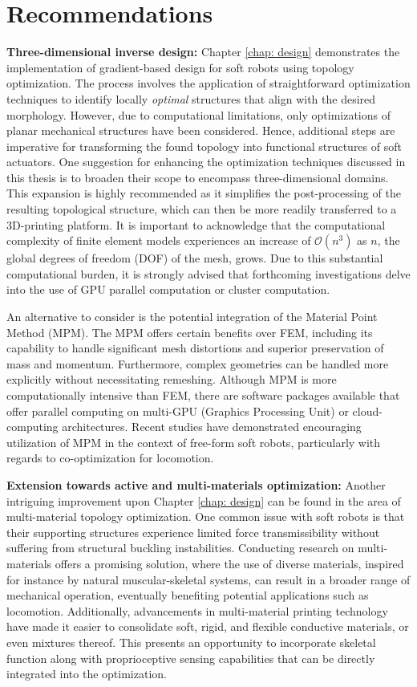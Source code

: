 \section[Recommendations]{Recommendations}
\textbf{Three-dimensional inverse design:}  Chapter \ref{chap: design} demonstrates the implementation of gradient-based design for soft robots using topology optimization. The process involves the application of straightforward optimization techniques to identify locally \textit{optimal} structures that align with the desired morphology. However, due to computational limitations, only optimizations of planar mechanical structures have been considered. Hence, additional steps are imperative for transforming the found topology into functional structures of soft actuators. One suggestion for enhancing the optimization techniques discussed in this thesis is to broaden their scope to encompass three-dimensional domains. This expansion is highly recommended as it simplifies the post-processing of the resulting topological structure, which can then be more readily transferred to a 3D-printing platform. It is important to acknowledge that the computational complexity of finite element models experiences an increase of $\mathcal{O}(n^3)$ as $n$, the global degrees of freedom (DOF) of the mesh, grows. Due to this substantial computational burden, it is strongly advised that forthcoming investigations delve into the use of GPU parallel computation or cluster computation.

An alternative to consider is the potential integration of the Material Point Method (MPM). The MPM offers certain benefits over FEM, including its capability to handle significant mesh distortions and superior preservation of mass and momentum. Furthermore, complex geometries can be handled more explicitly without necessitating remeshing. Although MPM is more computationally intensive than FEM, there are software packages available that offer parallel computing on multi-GPU (Graphics Processing Unit) or cloud-computing architectures. Recent studies have demonstrated encouraging utilization of MPM in the context of free-form soft robots, particularly with regards to co-optimization for locomotion. 

\textbf{Extension towards active and multi-materials optimization:} Another intriguing improvement upon Chapter \ref{chap: design} can be found in the area of multi-material topology optimization. One common issue with soft robots is that their supporting structures experience limited force transmissibility without suffering from structural buckling instabilities. Conducting research on multi-materials offers a promising solution, where the use of diverse materials, inspired for instance by natural muscular-skeletal systems, can result in a broader range of mechanical operation, eventually benefiting potential applications such as locomotion. Additionally, advancements in multi-material printing technology have made it easier to consolidate soft, rigid, and flexible conductive materials, or even mixtures thereof. This presents an opportunity to incorporate skeletal function along with proprioceptive sensing capabilities that can be directly integrated into the optimization.

